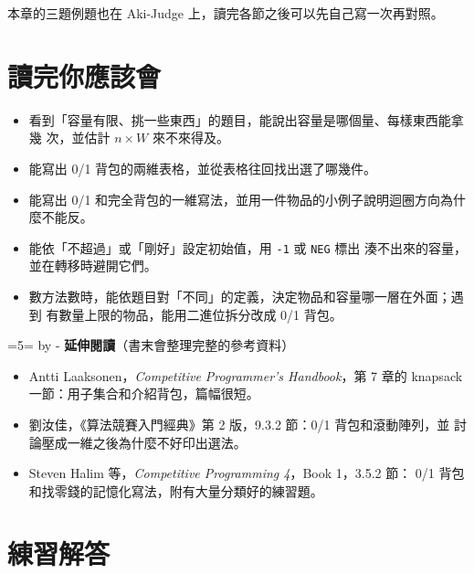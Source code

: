本章的三題例題也在 Aki-Judge 上，讀完各節之後可以先自己寫一次再對照。

\section{讀完你應該會}
\label{sec:knap-checklist}

\begin{itemize}
\item 看到「容量有限、挑一些東西」的題目，能說出容量是哪個量、每樣東西能拿幾
次，並估計 $n \times W$ 來不來得及。
\item 能寫出 0/1 背包的兩維表格，並從表格往回找出選了哪幾件。
\item 能寫出 0/1 和完全背包的一維寫法，並用一件物品的小例子說明迴圈方向為什
麼不能反。
\item 能依「不超過」或「剛好」設定初始值，用 \texttt{-1} 或 \texttt{NEG} 標出
湊不出來的容量，並在轉移時避開它們。
\item 數方法數時，能依題目對「不同」的定義，決定物品和容量哪一層在外面；遇到
有數量上限的物品，能用二進位拆分改成 0/1 背包。
\end{itemize}

\par\begingroup{}=5\baselineskip {}=\pagegoal \advance{} by -\pagetotal
\ifdim\dimen0>\dimen2 \ifdim\dimen2>0pt \vfil\fi \break\fi\endgroup
\textbf{延伸閱讀}（書末會整理完整的參考資料）

\begin{itemize}
\item Antti Laaksonen，\textit{Competitive Programmer's Handbook}，第 7 章的
knapsack 一節：用子集合和介紹背包，篇幅很短。
\item 劉汝佳，《算法競賽入門經典》第 2 版，9.3.2 節：0/1 背包和滾動陣列，並
討論壓成一維之後為什麼不好印出選法。
\item Steven Halim 等，\textit{Competitive Programming 4}，Book 1，3.5.2 節：
0/1 背包和找零錢的記憶化寫法，附有大量分類好的練習題。
\end{itemize}

\section*{練習解答}

